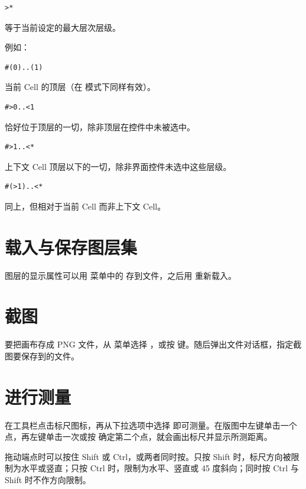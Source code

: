 \begin{lstlisting}
>*
\end{lstlisting}

等于当前设定的最大层次层级。

例如：

\begin{lstlisting}
#(0)..(1)
\end{lstlisting}

当前 Cell 的顶层（在  模式下同样有效）。

\begin{lstlisting}
#>0..<1
\end{lstlisting}

恰好位于顶层的一切，除非顶层在控件中未被选中。

\begin{lstlisting}
#>1..<*
\end{lstlisting}

上下文 Cell 顶层以下的一切，除非界面控件未选中这些层级。

\begin{lstlisting}
#(>1)..<*
\end{lstlisting}

同上，但相对于当前 Cell 而非上下文 Cell。

\section{载入与保存图层集}\label{sec:load_save_layers}

图层的显示属性可以用  菜单中的  存到文件，之后用  重新载入。

\section{截图}\label{sec:screenshots}

要把画布存成 PNG 文件，从  菜单选择 ，或按  键。随后弹出文件对话框，指定截图要保存到的文件。

\section{进行测量}\label{sec:measure}

在工具栏点击标尺图标，再从下拉选项中选择  即可测量。在版图中左键单击一个点，再左键单击一次或按  确定第二个点，就会画出标尺并显示所测距离。

拖动端点时可以按住 Shift 或 Ctrl，或两者同时按。只按 Shift 时，标尺方向被限制为水平或竖直；只按 Ctrl 时，限制为水平、竖直或 45 度斜向；同时按 Ctrl 与 Shift 时不作方向限制。

